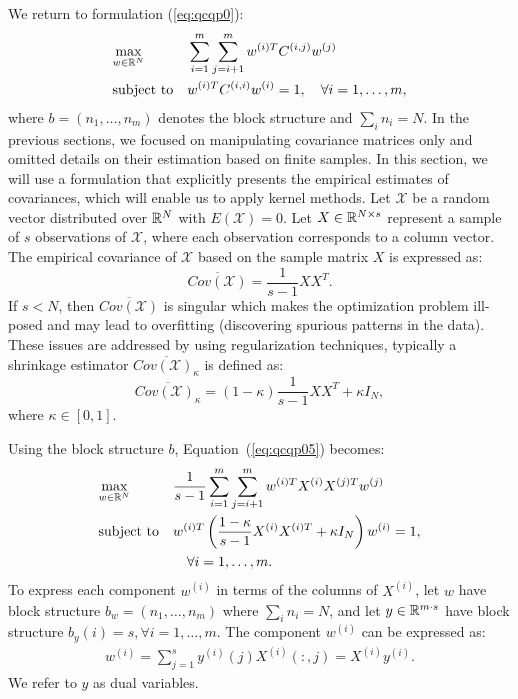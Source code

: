 We return to formulation (\ref{eq:qcqp0}):
\begin{equation*}
\begin{aligned}
& \underset{w \in \mathbb{R}^N}{\text{max}}
& & \sum_{i = 1}^m \sum_{j = i+1 }^m w^{(i)T} C^{(i,j)} w^{(j)}\\
& \text{subject to}
& &w^{(i)T} C^{(i,i)} w^{(i)} = 1, \quad\forall i = 1,\ldots, m,
\end{aligned}
\end{equation*}
where $b = \left(n_1,\ldots,n_m\right)$ denotes the block structure
and $ \sum_i n_i = N $.
In the previous sections, we focused on manipulating covariance matrices
only and omitted details on their estimation based on finite samples.
In this section, we will use a formulation that explicitly presents
the empirical estimates of covariances, which will enable us to apply kernel methods.
Let $\mathcal{X}$ be a random vector distributed over $\mathbb{R}^N$ with
$E\left(\mathcal{X}\right) = 0$. Let $X \in \mathbb{R}^{N \times s}$
represent a sample of $s$ observations of $\mathcal{X}$, where each
observation corresponds to a column vector. The empirical covariance of $\mathcal{X}$
based on the sample matrix $X$ is expressed as:
$$ \overline{Cov\left(\mathcal{X}\right)} = \frac{1}{s - 1}X X^T.$$
If $s < N$, then $\overline{Cov\left(\mathcal{X}\right)}$ is singular which
makes the optimization problem ill-posed and may lead to overfitting
(discovering spurious patterns in the data). These issues are addressed by
using regularization techniques, typically a shrinkage estimator
$\overline{Cov\left(\mathcal{X}\right)_{\kappa}}$ is defined as:
$$ \overline{Cov\left(\mathcal{X}\right)_{\kappa}} = \left(1-\kappa\right)
 \frac{1}{s - 1}X X^T + \kappa  I_N,$$ where $\kappa \in \left[0,1\right]$.

Using the block structure $b$, Equation~(\ref{eq:qcqp05}) becomes:
 \begin{equation}\label{eq:regqcqp}
\begin{aligned}
& \underset{w \in \mathbb{R}^N}{\text{max}}
& & \frac{1}{s -1} \sum_{i = 1}^m \sum_{j = i+1}^m w^{(i)T} X^{(i)}X^{(j)T} w^{(j)} \\
& \text{subject to}
& & w^{(i)T} \left(\frac{1- \kappa}{s - 1}X^{(i)} X^{(i)T} + \kappa  I_N\right) w^{(i)} = 1,\\&&& \quad\forall i = 1,\ldots, m.
\end{aligned}
\end{equation}
To express each component $w^{(i)}$ in terms of the columns of $X^{(i)}$,
let $w$ have block structure $b_w = \left(n_1, \ldots, n_m\right)$
where $\sum_i n_i = N$, and let $y \in \mathbb{R}^{m\cdot s}$ have block
structure $b_y\left(i\right) = s, \forall i = 1,\ldots, m$. The
component $w^{(i)}$ can be expressed as:
\begin{equation}\label{eq:representer}
\begin{aligned}
w^{(i)} = \sum_{j = 1}^{s} y^{(i)}\left(j\right) X^{(i)}\left(:,j\right) = X^{(i)} y^{(i)}.
\end{aligned}
\end{equation}
We refer to $y$ as dual variables.

